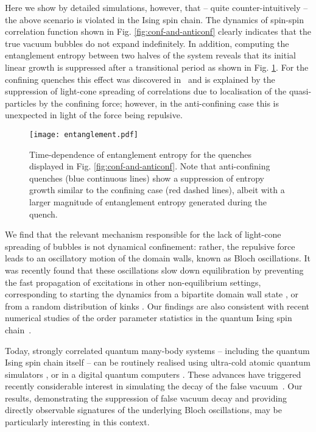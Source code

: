 \documentclass[amsmath,amssymb,11pt]{article}
\numberwithin{equation}{section}
\numberwithin{figure}{section}
\numberwithin{table}{section}
\begin{document}
Here we show by detailed simulations, however, that -- quite counter-intuitively -- the {above scenario} is violated in the Ising spin chain.  The dynamics of spin-spin correlation function shown in Fig. \ref{fig:conf-and-anticonf} clearly indicates that the true vacuum bubbles do not expand indefinitely. {In addition, computing the entanglement entropy between two halves of the system reveals that its initial linear growth is suppressed after a transitional period as shown in Fig. \ref{fig:ent_entropy}. For the confining quenches this effect was discovered in~\cite{2017NatPh..13..246K} and is explained by the suppression of light-cone spreading of correlations due to localisation of the quasi-particles by the confining force; however, in the anti-confining case this is unexpected in light of the force being repulsive.}

\begin{figure}
    \centering
    \texttt{[image: entanglement.pdf]}
    \caption{{Time-dependence of entanglement entropy for the quenches displayed in Fig. \ref{fig:conf-and-anticonf}. Note that anti-confining quenches (blue continuous lines) show a suppression of entropy growth similar to the confining case (red dashed lines), albeit with a larger magnitude of entanglement entropy generated during the quench.}}
    \label{fig:ent_entropy}
\end{figure}

We find that the relevant mechanism responsible for the lack of light-cone spreading of bubbles is not dynamical confinement: rather, the repulsive force leads to an oscillatory motion of the domain walls, known as Bloch oscillations. It was recently found that these oscillations slow down equilibration by preventing the fast propagation of excitations in other non-equilibrium settings, corresponding to starting the dynamics from a bipartite domain wall state \cite{2019PhRvB..99r0302M}, or from a random distribution of kinks \cite{2020PhRvB.102d1118L}. Our findings are also consistent with recent numerical studies of the order parameter statistics in the quantum Ising spin chain~\cite{2020arXiv200501679T}.

Today, strongly correlated quantum many-body systems -- including the quantum Ising spin chain itself \cite{2021PhRvA.103d3312L} -- can be routinely realised using ultra-cold atomic quantum simulators  \cite{2008NatPh...4..757F,2011Sci...334...57L,Gross995,2017Natur.551..579B,2021RvMP...93b5001M}, or in a digital quantum computers \cite{2020arXiv200103044V}.  These  advances have triggered recently considerable interest in simulating the decay of the false vacuum~\cite{2019PhRvD.100f5016B,2020PhRvA.102d3324B,Abel_2021,2021PRXQuantum.2.010350,2021arXiv210407428B}. Our results, demonstrating the suppression of false vacuum decay and providing directly observable signatures of the underlying Bloch oscillations, may be particularly interesting in this context.
\end{document}
